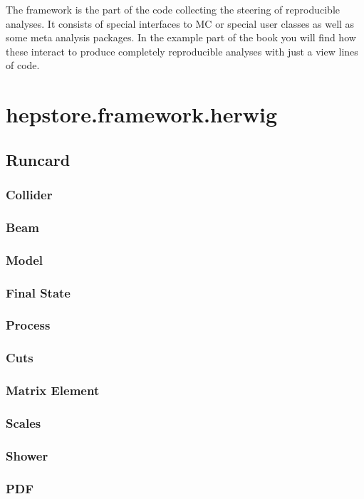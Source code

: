 
The framework is the part of the code collecting the steering of
reproducible analyses. It consists of special interfaces to MC or
special user classes as well as some meta analysis packages. In the
example part of the book you will find how these interact to produce
completely reproducible analyses with just a view lines of code.

\section{hepstore.framework.herwig}

\subsection{Runcard}
\subsubsection{Collider}
\subsubsection{Beam}
\subsubsection{Model}
\subsubsection{Final State}
\subsubsection{Process}
\subsubsection{Cuts}
\subsubsection{Matrix Element}
\subsubsection{Scales}
\subsubsection{Shower}
\subsubsection{PDF}
